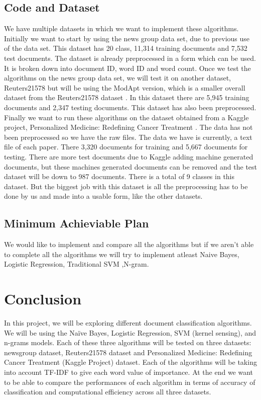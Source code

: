 \documentclass[a4paper, 11pt]{article}
\begin{document}
\subsection{Code and Dataset}
We have multiple datasets in which we want to implement these algorithms. Initially we want to start by using the news group data set, due to previous use of the data set. This dataset has 20 class, 11,314 training documents and 7,532 test documents. The dataset is already preprocessed in a form which can be used. It is broken down into document ID, word ID and word count. Once we test the algorithms on the news group data set, we will test it on another dataset, Reuters21578 but will be using the ModApt version, which is a smaller overall dataset from the Reuters21578 dataset \cite{dataset}. In this dataset there are 5,945 training documents and 2,347 testing documents. This dataset has also been preprocessed. Finally we want to run these algorithms on the dataset obtained from a Kaggle project, Personalized Medicine: Redefining Cancer Treatment \cite{kaggledataset}. The data has not been preprocessed so we have the raw files. The data we have is currently, a text file of each paper. There 3,320 documents for training and 5,667 documents for testing. There are more test documents due to Kaggle adding machine generated documents, but these machines generated documents can be removed and the test dataset will be down to 987 documents. There is a total of 9 classes in this dataset. But the biggest job with this dataset is all the preprocessing has to be done by us and made into a usable form, like the other datasets. 

\subsection{Minimum Achieviable Plan}
We would like to implement and compare all the algorithms but if we aren't able to complete all the algorithms we will try to implement atleast Naive Bayes, Logistic Regression, Traditional SVM ,N-gram.

\section{Conclusion}
In this project, we will be exploring different document classification algorithms. We will be using the Naïve Bayes, Logistic Regression, SVM (kernel sensing), and n-grams models. Each of these three algorithms will be tested on three datasets: newsgroup dataset, Reuters21578 dataset and Personalized Medicine: Redefining Cancer Treatment (Kaggle Project) dataset. Each of the algorithms will be taking into account TF-IDF to give each word value of importance. At the end we want to be able to compare the performances of each algorithm in terms of accuracy of classification and computational efficiency across all three datasets. 
\end{document}
